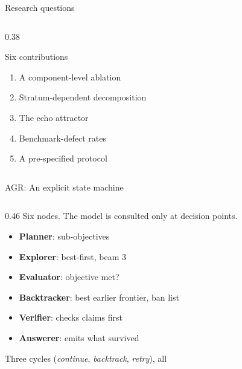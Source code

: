\begin{frame}{Research questions}
\begin{columns}[T]
\begin{column}{0.38\textwidth}
\begin{block}{Six contributions}
\begin{enumerate}
          \item A component-level ablation
          \item Stratum-dependent decomposition
          \item The echo attractor
          \item Benchmark-defect rates
          \item A pre-specified protocol
        \end{enumerate}
      \end{block}
    \end{column}
  \end{columns}
  \centrebody
\end{frame}

\begin{frame}{AGR: An explicit state machine}
  \begin{columns}[T]
    \begin{column}{0.46\textwidth}
      \small\let\raggedright\agrraggedright\agrraggedright
      Six nodes. The model is consulted only at decision points.
      \begin{itemize}\setlength{\itemsep}{0pt}\setlength{\parskip}{0pt}
        \item \textbf{Planner}: sub-objectives
        \item \textbf{Explorer}: best-first, beam 3
        \item \textbf{Evaluator}: objective met?
        \item \textbf{Backtracker}: best earlier frontier, ban list
        \item \textbf{Verifier}: checks claims first
        \item \textbf{Answerer}: emits what survived
      \end{itemize}
      Three cycles (\emph{continue}, \emph{backtrack}, \emph{retry}), all

\end{column}
\end{columns}
\end{frame}
